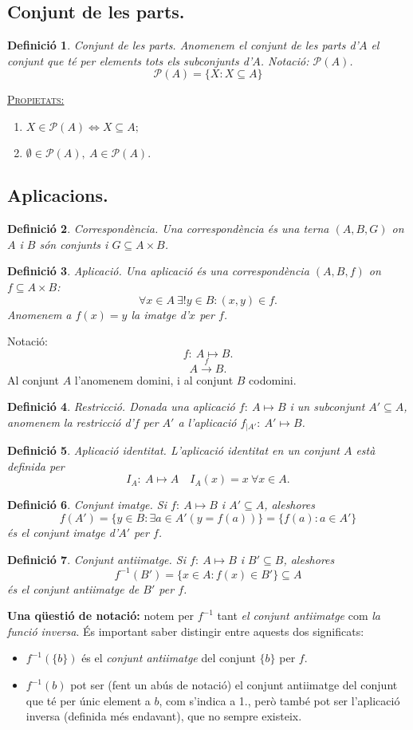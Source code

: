 \documentclass[11pt]{article}
\newcommand{\propietats}{\underline{{\scshape Propietats:}}}
\newtheorem{defi}{Definició}[section]
\begin{document}
\subsection{Conjunt de les parts.}
\begin{defi}
Conjunt de les parts. Anomenem el conjunt de les parts d'$A$ el conjunt que té per elements tots els subconjunts d'$A$. Notació: $\mathcal{P}(A)$.
$$\mathcal{P}(A)=\{X:X\subseteq A\}$$
\end{defi}
\noindent\propietats
\begin{enumerate}
\item $X\in\mathcal{P}(A)\iff X\subseteq A;$
\item $\emptyset\in\mathcal{P}(A),\ A\in\mathcal{P}(A).$
\end{enumerate}
\subsection{Aplicacions.}
\begin{defi}
Correspondència. Una correspondència és una terna $(A,B,G)$ on $A$ i $B$ són conjunts i $G\subseteq A\times B$.
\end{defi}
\begin{defi}
Aplicació. Una aplicació és una correspondència $(A,B,f)$ on $f\subseteq A\times B$:
$$\forall x\in A \ \exists!y\in B:(x,y)\in f.$$
Anomenem a $f(x)=y$ la imatge d'$x$ per $f$.
\end{defi}
\noindent Notació:
$$f: \ A\mapsto B.$$
$$A\xrightarrow{f}B.$$
\noindent Al conjunt $A$ l'anomenem domini, i al conjunt $B$ codomini.\\
\begin{defi}
Restricció. Donada una aplicació $f: \ A\mapsto B$ i un subconjunt $A'\subseteq A$, anomenem la restricció d'$f$ per $A'$ a l'aplicació $f_{|A'}: \ A'\mapsto B$.
\end{defi}
\begin{defi}
Aplicació identitat. L'aplicació identitat en un conjunt $A$ està definida per
$$I_A:\ A\mapsto A \quad I_A(x)=x\ \forall x\in A.$$
\end{defi}
\begin{defi}
Conjunt imatge. Si $f: \ A\mapsto B$ i $A'\subseteq A$, aleshores
$$f(A')=\{y\in B:\exists a\in A'(y=f(a))\}=\{f(a):a\in A'\}$$
és el conjunt imatge d'$A'$ per $f$.
\end{defi}
\begin{defi}
Conjunt antiimatge. Si $f: \ A\mapsto B$ i $B'\subseteq B$, aleshores
$$f^{-1}(B')=\{x\in A:f(x)\in B'\}\subseteq A$$
és el conjunt antiimatge de $B'$ per $f$.
\end{defi}
\noindent\textbf{Una qüestió de notació:} notem per $f^{-1}$ tant \textit{el conjunt antiimatge} com \textit{la funció inversa}. És important saber distingir entre aquests dos significats:
\begin{itemize}
\item $f^{-1}(\{b\})$ és el \textit{conjunt antiimatge} del conjunt $\{b\}$ per $f$.
\item $f^{-1}(b)$ pot ser (fent un abús de notació) el conjunt antiimatge del conjunt que té per únic element a $b$, com s'indica a 1., però també pot ser l'aplicació inversa (definida més endavant), que no sempre existeix.
\end{itemize}
\end{document}
